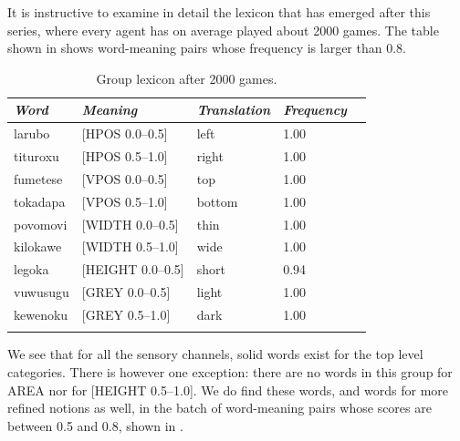 It is instructive to examine in detail the lexicon 
that has emerged after this series, where every agent
has on average played about 2000 games. The table shown in  
shows word-meaning pairs whose 
frequency is larger than 0.8. 


\begin{table}
\begin{center}
\begin{tabular}{ l  l  l  l  l }
\lsptoprule
{\itshape Word}&{\itshape Meaning}& {\itshape Translation} & {\itshape Frequency} \\ \midrule
larubo & [HPOS 0.0–0.5] & left & 1.00 \\ 
tituroxu & [HPOS 0.5–1.0] & right & 1.00 \\ 
fumetese & [VPOS 0.0–0.5] & top & 1.00 \\ 
tokadapa & [VPOS 0.5–1.0] & bottom & 1.00 \\ 
povomovi & [WIDTH 0.0–0.5] & thin & 1.00 \\ 
kilokawe & [WIDTH 0.5–1.0] & wide & 1.00 \\ 
legoka & [HEIGHT 0.0–0.5] & short & 0.94\\  
vuwusugu & [GREY 0.0–0.5] & light & 1.00 \\ 
kewenoku & [GREY 0.5–1.0] & dark & 1.00 \\ 
\lspbottomrule
\end{tabular}
\caption{\label{tab:after2000}Group lexicon after 2000 games.}
\end{center}
\end{table}

We see that for all the sensory channels, solid words
exist for the top level categories. There is however
one exception: there are no words in this group for AREA
nor for [HEIGHT 0.5–1.0]. We do find these words, and 
words for more refined notions as well, in the 
batch of word-meaning pairs whose scores are between 0.5 and 0.8, shown 
in . 



